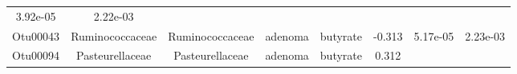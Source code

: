 \documentclass[11pt,]{article}
\begin{document}
\begin{longtable}[]{@{}cccccccc@{}}
\begin{minipage}[t]{0.08\columnwidth}
3.92e-05\strut
\end{minipage} & \begin{minipage}[t]{0.08\columnwidth}\centering\strut
2.22e-03\strut
\end{minipage}\tabularnewline
\begin{minipage}[t]{0.08\columnwidth}\centering\strut
Otu00043\strut
\end{minipage} & \begin{minipage}[t]{0.15\columnwidth}\centering\strut
Ruminococcaceae\strut
\end{minipage} & \begin{minipage}[t]{0.15\columnwidth}\centering\strut
Ruminococcaceae\strut
\end{minipage} & \begin{minipage}[t]{0.08\columnwidth}\centering\strut
adenoma\strut
\end{minipage} & \begin{minipage}[t]{0.09\columnwidth}\centering\strut
butyrate\strut
\end{minipage} & \begin{minipage}[t]{0.07\columnwidth}\centering\strut
-0.313\strut
\end{minipage} & \begin{minipage}[t]{0.08\columnwidth}\centering\strut
5.17e-05\strut
\end{minipage} & \begin{minipage}[t]{0.08\columnwidth}\centering\strut
2.23e-03\strut
\end{minipage}\tabularnewline
\begin{minipage}[t]{0.08\columnwidth}\centering\strut
Otu00094\strut
\end{minipage} & \begin{minipage}[t]{0.15\columnwidth}\centering\strut
Pasteurellaceae\strut
\end{minipage} & \begin{minipage}[t]{0.15\columnwidth}\centering\strut
Pasteurellaceae\strut
\end{minipage} & \begin{minipage}[t]{0.08\columnwidth}\centering\strut
adenoma\strut
\end{minipage} & \begin{minipage}[t]{0.09\columnwidth}\centering\strut
butyrate\strut
\end{minipage} & \begin{minipage}[t]{0.07\columnwidth}\centering\strut
0.312\strut
\end{minipage} & \begin{minipage}[t]{0.08\columnwidth}\centering\strut

\end{minipage}
\end{longtable}
\end{document}
